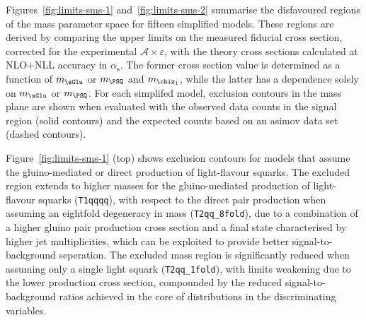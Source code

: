 Figures~\ref{fig:limits-sms-1} and~\ref{fig:limits-sms-2} summarise
the disfavoured regions of the mass parameter space for fifteen
simplified models. These regions are derived by comparing the upper
limits on the measured fiducial cross section, corrected for the
experimental $\mathcal{A}\times\varepsilon$, with the theory cross
sections calculated at NLO+NLL accuracy in $\alpha_\text{s}$. The
former cross section value is determined as a function of $m_{\sGlu}$
or $m_{\PSQ}$ and $m_{\chiz_1}$, while the latter has a dependence
solely on $m_{\sGlu}$ or $m_{\PSQ}$. For each simplifed model,
exclusion contours in the mass plane are shown when evaluated with the
observed data counts in the signal region (solid contours) and the
expected counts based on an asimov data set (dashed contours).

Figure~\ref{fig:limits-sms-1} (top) shows exclusion contours for
models that assume the gluino-mediated or direct production of
light-flavour squarks. The excluded region extends to higher masses
for the gluino-mediated production of light-flavour squarks
(\texttt{T1qqqq}), with respect to the direct pair production when
assuming an eightfold degeneracy in mass (\texttt{T2qq\_8fold}), due
to a combination of a higher gluino pair production cross section and
a final state characterised by higher jet multiplicities, which can be
exploited to provide better signal-to-background seperation. The
excluded mass region is significantly reduced when assuming only a
single light squark (\texttt{T2qq\_1fold}), with limits weakening due
to the lower production cross section, compounded by the reduced
signal-to-background ratios achieved in the core of distributions in
the discriminating variables.

